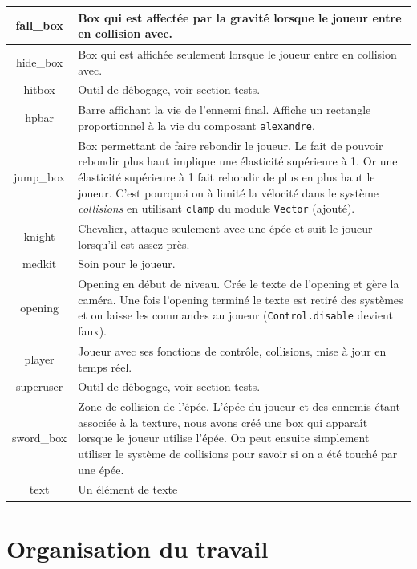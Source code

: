 \documentclass{article}
\begin{document}
\begin{center}
\begin{tabular}[h]{ |c|p{10cm}| }
        \hline
        fall\_box & Box qui est affectée par la gravité lorsque le joueur entre en collision avec. \\
        \hline
        hide\_box & Box qui est affichée seulement lorsque le joueur entre en collision avec. \\
        \hline
        hitbox & Outil de débogage, voir section tests. \\
        \hline
        hpbar & Barre affichant la vie de l'ennemi final. Affiche un rectangle proportionnel à la vie du composant \verb|alexandre|. \\
        \hline
        jump\_box & Box permettant de faire rebondir le joueur. Le fait de pouvoir rebondir plus haut implique une élasticité 
        supérieure à 1. Or une élasticité supérieure à 1 fait rebondir de plus en plus haut le joueur. C'est pourquoi on à limité la 
        vélocité dans le système \textit{collisions} en utilisant \verb|clamp| du module \verb|Vector| (ajouté). \\
        \hline
        knight & Chevalier, attaque seulement avec une épée et suit le joueur lorsqu'il est assez près. \\
        \hline
        medkit & Soin pour le joueur. \\
        \hline
        opening & Opening en début de niveau. Crée le texte de l'opening et gère la caméra. Une fois l'opening terminé 
        le texte est retiré des systèmes et on laisse les commandes au joueur (\verb|Control.disable| devient faux). \\
        \hline
        player & Joueur avec ses fonctions de contrôle, collisions, mise à jour en temps réel. \\
        \hline
        superuser & Outil de débogage, voir section tests. \\
        \hline
        sword\_box & Zone de collision de l'épée. L'épée du joueur et des ennemis étant associée à la texture, nous avons 
        créé une box qui apparaît lorsque le joueur utilise l'épée. On peut ensuite simplement utiliser le système de collisions 
        pour savoir si on a été touché par une épée. \\
        \hline
        text & Un élément de texte \\
        \hline

    \end{tabular}
\end{center}



\section{Organisation du travail}
\end{document}
